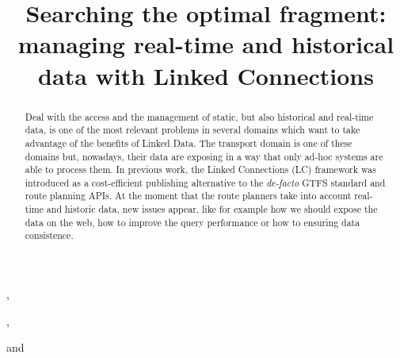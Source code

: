 \documentclass[sw]{iosart2x}
\begin{document}
\begin{frontmatter}

\title{Searching the optimal fragment: managing real-time and historical data with Linked Connections}


\author[A]{ },
\author[B]{ },
\author[B]{ }
\author[A]{ }
and
\author[B]{ }
\address[A]{Ontology Engineering Group, , }
\address[B]{IDLab, Department of Electronics and Information Systems, , 
}


\begin{abstract}
Deal with the access and the management of static, but also historical and real-time data, is one of the most relevant problems in several domains which want to take advantage of the benefits of Linked Data. The transport domain is one of these domains but, nowadays, their data are exposing in a way that only ad-hoc systems are able to process them. In previous work, the Linked Connections (LC) framework was introduced as a cost-efficient publishing alternative to the \textit{de-facto} GTFS standard and route planning APIs. At the moment that the route planners take into account real-time and historic data, new issues appear, like for example how we should expose the data on the web, how to improve the query performance or how to ensuring data consistence.


\end{abstract}
\end{frontmatter}
\end{document}

